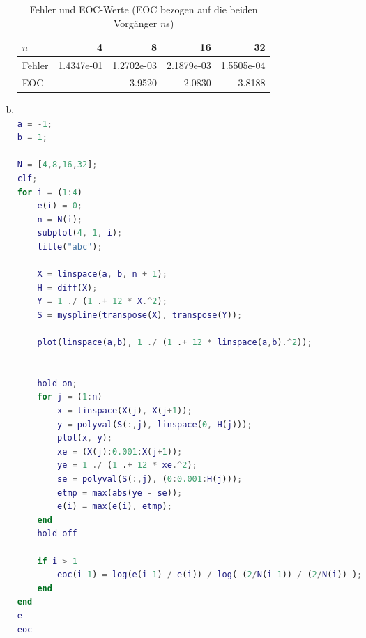 \documentclass[a4paper]{scrartcl}
\begin{document}
\begin{aufgabe}
\begin{enumerate}[a)]
		\begin{table}[h]
			\centering
			\caption{Fehler und EOC-Werte (EOC bezogen auf die beiden Vorgänger $n$s)}
			\begin{tabular}{l|rrrr}
				$n$ & 4 & 8 & 16 & 32 \\ \hline
				Fehler & 1.4347e-01 & 1.2702e-03 & 2.1879e-03 & 1.5505e-04 \\ \hline
				EOC & & 3.9520 & 2.0830 & 3.8188
			\end{tabular}
		\end{table}
		\newpage
		\item
			\begin{lstlisting}[language=matlab,tabsize=4]
% Stephan Hilb, 2706616

a = -1;
b = 1;

N = [4,8,16,32];
clf;
for i = (1:4)
	e(i) = 0;
	n = N(i);
    subplot(4, 1, i);
	title("abc");

	X = linspace(a, b, n + 1);
	H = diff(X);
	Y = 1 ./ (1 .+ 12 * X.^2);
	S = myspline(transpose(X), transpose(Y));

	plot(linspace(a,b), 1 ./ (1 .+ 12 * linspace(a,b).^2));


	hold on;
	for j = (1:n)
		x = linspace(X(j), X(j+1));
		y = polyval(S(:,j), linspace(0, H(j)));
		plot(x, y);
		xe = (X(j):0.001:X(j+1));
		ye = 1 ./ (1 .+ 12 * xe.^2);
		se = polyval(S(:,j), (0:0.001:H(j)));
		etmp = max(abs(ye - se));
		e(i) = max(e(i), etmp);
	end
	hold off

	if i > 1
		eoc(i-1) = log(e(i-1) / e(i)) / log( (2/N(i-1)) / (2/N(i)) );
	end
end
e
eoc
			\end{lstlisting}
	\end{enumerate}
\end{aufgabe}
\end{document}
